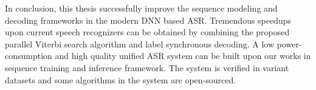 \begin{englishabstract}
In conclusion, this thesis successfully improve the sequence modeling and decoding frameworks in the modern DNN based ASR. Tremendous speedups upon current speech recognizers can be obtained by combining the proposed parallel Viterbi search algorithm and label synchronous decoding. A low power-consumption and high quality unified ASR system can be built upon our works in sequence training and inference framework. The system is verified in variant datasets and some algorithms in the system are open-sourced.

\end{englishabstract}

